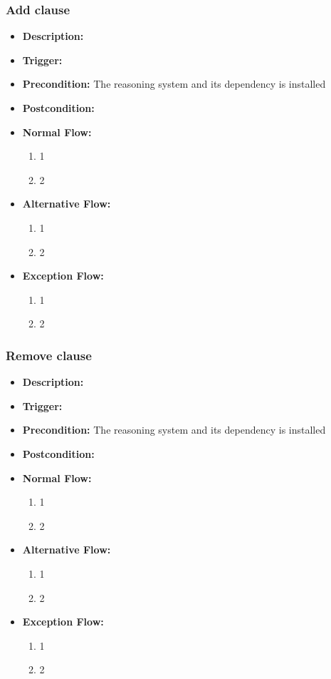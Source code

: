 \documentclass[../gr-final.tex]{subfiles}
\begin{document}
\subsubsection{Add clause}
\begin{itemize}
  \item {\bfseries Description:} 
  \item {\bfseries Trigger:}
  \item {\bfseries Precondition:} The reasoning system and its
    dependency is installed
    
  \item {\bfseries Postcondition:}

  \item {\bfseries Normal Flow:}
    \begin{enumerate}
      \item 1
      \item 2
    \end{enumerate}
  \item {\bfseries Alternative Flow:}
    \begin{enumerate}
      \item 1
      \item 2
    \end{enumerate}
  \item {\bfseries Exception Flow:}
    \begin{enumerate}
      \item 1
      \item 2
    \end{enumerate}
\end{itemize}
\subsubsection{Remove clause}
\begin{itemize}
  \item {\bfseries Description:} 
  \item {\bfseries Trigger:}
  \item {\bfseries Precondition:} The reasoning system and its
    dependency is installed
    
  \item {\bfseries Postcondition:}

  \item {\bfseries Normal Flow:}
    \begin{enumerate}
      \item 1
      \item 2
    \end{enumerate}
  \item {\bfseries Alternative Flow:}
    \begin{enumerate}
      \item 1
      \item 2
    \end{enumerate}
  \item {\bfseries Exception Flow:}
    \begin{enumerate}
      \item 1
      \item 2
    \end{enumerate}
\end{itemize}
\end{document}
